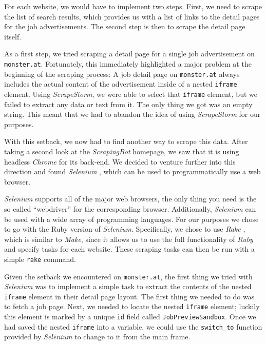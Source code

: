 \documentclass[runningheads]{llncs}
\begin{document}
For each website, we would have to implement two steps. First, we need to scrape the list of search results, which provides us with a list of links to the detail pages for the job advertisements. The second step is then to scrape the detail page itself.

As a first step, we tried scraping a detail page for a single job advertisement on \texttt{monster.at}. Fortunately, this immediately highlighted a major problem at the beginning of the scraping process: A job detail page on \texttt{monster.at} always includes the actual content of the advertisement inside of a nested \texttt{iframe} element. Using \textit{ScrapeStorm}, we were able to select that \texttt{iframe} element, but we failed to extract any data or text from it. The only thing we got was an empty string. This meant that we had to abandon the idea of using \textit{ScrapeStorm} for our purposes.

With this setback, we now had to find another way to scrape this data. After taking a second look at the \textit{ScrapingBot} homepage, we saw that it is using headless \textit{Chrome} for its back-end. We decided to venture further into this direction and found \textit{Selenium} \cite{selenium}, which can be used to programmatically use a web browser.

\textit{Selenium} supports all of the major web browsers, the only thing you need is the so called “webdriver” for the corresponding browser. Additionally, \textit{Selenium} can be used with a wide array of programming languages. For our purposes we chose to go with the Ruby version of \textit{Selenium}. Specifically, we chose to use \textit{Rake} \cite{rake}, which is similar to \textit{Make}, since it allows us to use the full functionality of \textit{Ruby} \cite{ruby} and specify tasks for each website. These scraping tasks can then be run with a simple \texttt{rake} command.

Given the setback we encountered on \texttt{monster.at}, the first thing we tried with \textit{Selenium} was to implement a simple task to extract the contents of the nested \texttt{iframe} element in their detail page layout. The first thing we needed to do was to fetch a job page. Next, we needed to locate the nested \texttt{iframe} element; luckily this element is marked by a unique \texttt{id} field called \texttt{JobPreviewSandbox}. Once we had saved the nested \texttt{iframe} into a variable, we could use the \texttt{switch\_to} function provided by \textit{Selenium} to change to it from the main frame.
\end{document}
